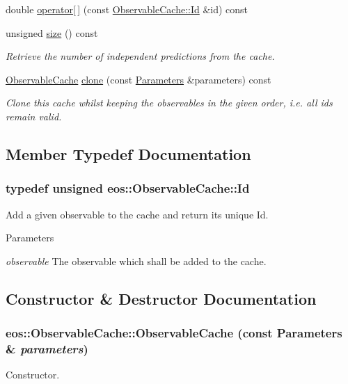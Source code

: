 \begin{DoxyCompactItemize}
double \hyperlink{classeos_1_1ObservableCache_a9ad7f1672817b0d69bda7dfc9471bc43}{operator\mbox{[}$\,$\mbox{]}} (const \hyperlink{classeos_1_1ObservableCache_a393f1d7c8c2a58bc95845e12b615c6ee}{ObservableCache::Id} \&id) const 
\item 
unsigned \hyperlink{classeos_1_1ObservableCache_a8cf868c54289d6ec010c72cdab954ded}{size} () const 
\begin{DoxyCompactList}\small\item\em Retrieve the number of independent predictions from the cache. \item\end{DoxyCompactList}\item 
\hyperlink{classeos_1_1ObservableCache}{ObservableCache} \hyperlink{classeos_1_1ObservableCache_af1f92ddabdeb26ae35ba66f8e6b73c18}{clone} (const \hyperlink{classeos_1_1Parameters}{Parameters} \&parameters) const 
\begin{DoxyCompactList}\small\item\em Clone this cache whilst keeping the observables in the given order, i.e. all ids remain valid. \item\end{DoxyCompactList}\end{DoxyCompactItemize}


\subsection{Member Typedef Documentation}
\hypertarget{classeos_1_1ObservableCache_a393f1d7c8c2a58bc95845e12b615c6ee}{
\subsubsection[{Id}]{\setlength{\rightskip}{0pt plus 5cm}typedef unsigned {\bf eos::ObservableCache::Id}}}
\label{classeos_1_1ObservableCache_a393f1d7c8c2a58bc95845e12b615c6ee}
Add a given observable to the cache and return its unique Id.


\begin{DoxyParams}{Parameters}
\item[{\em observable}]The observable which shall be added to the cache. \end{DoxyParams}


\subsection{Constructor \& Destructor Documentation}
\hypertarget{classeos_1_1ObservableCache_afc29264c67c8404ab659ab3ebce0677a}{
\subsubsection[{ObservableCache}]{\setlength{\rightskip}{0pt plus 5cm}eos::ObservableCache::ObservableCache (const {\bf Parameters} \& {\em parameters})}}
\label{classeos_1_1ObservableCache_afc29264c67c8404ab659ab3ebce0677a}
Constructor.


